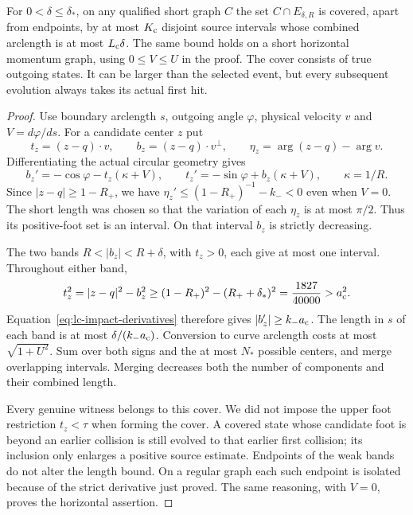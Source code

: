 \begin{lemma}\label{lem:lc-cover}
For $0<\delta\le\delta_*$, on any qualified short graph $C$ the
set $C\cap E_{\delta,R}$ is covered, apart from endpoints, by at
most $K_{\rm c}$ disjoint source intervals whose combined arclength
is at most $L_{\rm c}\delta$.  The same bound holds on a short
horizontal momentum graph, using $0\le V\le U$ in the proof.
The cover consists of true outgoing states.  It can be larger than
the selected event, but every subsequent evolution always takes its
actual first hit.
\end{lemma}
\begin{proof}
Use boundary arclength $s$, outgoing angle $\varphi$, physical
velocity $v$ and $V=d\varphi/ds$.  For a candidate center $z$ put
\[
 t_z=(z-q)\cdot v,\qquad b_z=(z-q)\cdot v^\perp,
 \qquad \eta_z=\arg(z-q)-\arg v.
\]
Differentiating the actual circular geometry gives
\begin{equation}\label{eq:lc-impact-derivatives}
 b_z'=-\cos\varphi-t_z(\kappa+V),\qquad
 t_z'=-\sin\varphi+b_z(\kappa+V),\qquad \kappa=1/R.
\end{equation}
Since $|z-q|\ge1-R_+$, we have
$\eta_z'\le(1-R_+)^{-1}-k_-<0$ even when $V=0$.
The short length was chosen so that the variation of each $\eta_z$
is at most $\pi/2$.  Thus its positive-foot set is an interval.
On that interval $b_z$ is strictly decreasing.

The two bands $R<|b_z|<R+\delta$, with $t_z>0$, each give at most
one interval.  Throughout either band,
\[
 t_z^2=|z-q|^2-b_z^2
 \ge(1-R_+)^2-(R_++\delta_*)^2
 =\frac{1827}{40000}>a_{\rm c}^2.
\]
Equation~\eqref{eq:lc-impact-derivatives} therefore gives
$|b_z'|\ge k_-a_{\rm c}$.  The length in $s$ of each band is at
most $\delta/(k_-a_{\rm c})$.  Conversion to curve arclength costs
at most $\sqrt{1+U^2}$.  Sum over both signs and the at most $N_*$
possible centers, and merge overlapping intervals.  Merging decreases
both the number of components and their combined length.

Every genuine witness belongs to this cover.  We did not impose the
upper foot restriction $t_z<\tau$ when forming the cover.  A covered
state whose candidate foot is beyond an earlier collision is still
evolved to that earlier first collision; its inclusion only enlarges
a positive source estimate.  Endpoints of the weak bands do not
alter the length bound.  On a regular graph each such endpoint is
isolated because of the strict derivative just proved.  The same
reasoning, with $V=0$, proves the horizontal assertion.
\end{proof}

